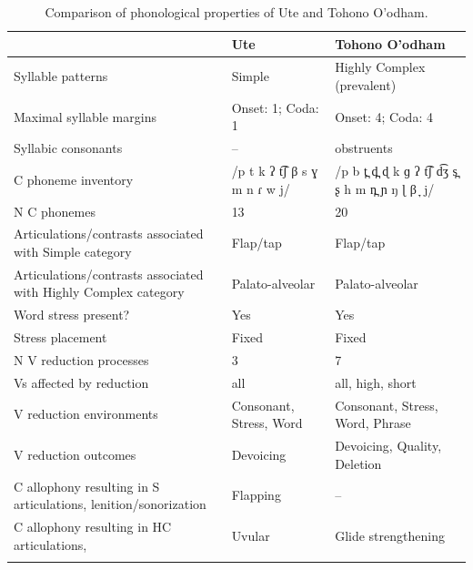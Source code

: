 \begin{table}
\small
\begin{tabularx}{\textwidth}{QQQ}
\lsptoprule
 & {Ute} & {Tohono O’odham}\\
 \midrule
 {Syllable patterns} & Simple & Highly Complex (prevalent)\\
 \tablevspace 
 {Maximal syllable margins} & Onset: 1; Coda: 1 & Onset: 4; Coda: 4\\
 \tablevspace 
 {Syllabic consonants} & -- & obstruents\\
 \tablevspace 
 {C phoneme inventory} & /p t k ʔ t͡ʃ β s ɣ m n ɾ w j/ & /p b t̪ d̪ ɖ k ɡ ʔ t͡ʃ d͡ʒ s̪ ʂ h m n̪ ɲ ŋ ɭ β ̞ j/\\
 \tablevspace 
 {N C phonemes} & 13 & 20\\
 \tablevspace 
 {Articulations/contrasts associated with {Simple}} {category} & {Flap/tap} & {Flap/tap}\\
 \tablevspace 
 {Articulations/contrasts associated with {Highly Complex}} {category} & { {Palato-alveolar}} & { {Palato-alveolar}}\\
 \tablevspace 
 {Word stress present?} & {Yes} & {Yes}\\
 \tablevspace 
 {Stress placement} & {Fixed} & {Fixed}\\
 \tablevspace 
 {N V reduction processes} & {3} & {7}\\
 \tablevspace 
 {Vs affected by reduction}  & {all} & {all, high, short}\\
 \tablevspace 
 {V reduction environments} & {Consonant, Stress, Word} & {Consonant, Stress, Word, Phrase}\\
 \tablevspace 
 {V reduction outcomes} & {Devoicing} & {Devoicing, Quality, Deletion}\\
 \tablevspace 
 {C allophony resulting in S articulations, lenition/sonorization} & {{Flapping}} & {--}\\
\tablevspace 
 {{C allophony resulting in HC articulations,} } & {{Uvular}} & {Glide strengthening}\\
\lspbottomrule
\end{tabularx}
\caption{\label{tab:8.2}Comparison of phonological properties of Ute and Tohono O’odham.}
\end{table}

